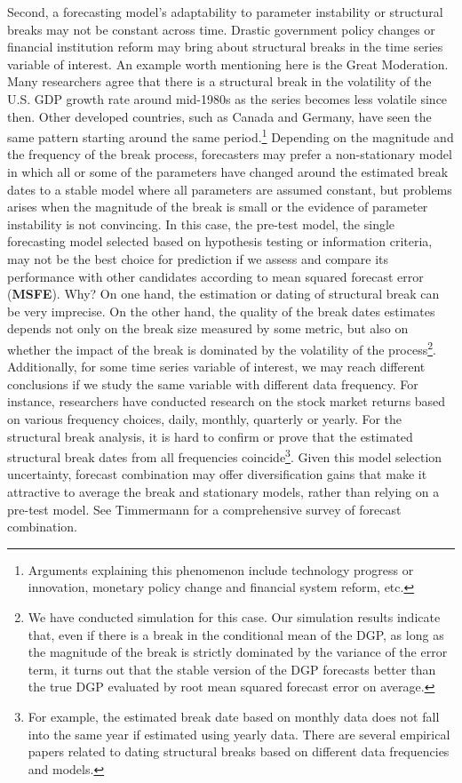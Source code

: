 Second, a forecasting model's adaptability to parameter instability or structural breaks may not be constant across time. Drastic government policy changes or financial institution reform may bring about structural breaks in the time series variable of interest. An example worth mentioning here is the Great Moderation. Many researchers \cite{Stock_Watson_JEL2003} \cite{Stock_DEECON2004} agree that there is a structural break in the volatility of the U.S. GDP growth rate around mid-1980s as the series becomes less volatile since then. Other developed countries, such as Canada and Germany, have seen the same pattern starting around the same period.\footnote{Arguments explaining this phenomenon include technology progress or innovation, monetary policy change and financial system reform, etc.} Depending on the magnitude and the frequency of the break process, forecasters may prefer a non-stationary model in which all or some of the parameters have changed around the estimated break dates to a stable model where all parameters are assumed constant, but problems arises when the magnitude of the break is small or the evidence of parameter instability is not convincing. In this case, the pre-test model, the single forecasting model selected based on hypothesis testing or information criteria, may not be the best choice for prediction if we assess and compare its performance with other candidates according to mean squared forecast error (\textbf{MSFE}). Why? On one hand, the estimation or dating of structural break can be very imprecise. On the other hand, the quality of the break dates estimates depends not only on the break size measured by some metric, but also on whether the impact of the break is dominated by the volatility of the process\footnote{We have conducted simulation for this case. Our simulation results indicate that, even if there is a break in the conditional mean of the DGP, as long as the magnitude of the break is strictly dominated by the variance of the error term, it turns out that the stable version of the DGP forecasts better than the true DGP evaluated by root mean squared forecast error on average.}. Additionally, for some time series variable of interest, we may reach different conclusions if we study the same variable with different data frequency. For instance, researchers have conducted research on the stock market returns based on various frequency choices, daily, monthly, quarterly or yearly. For the structural break analysis, it is hard to confirm or prove that the estimated structural break dates from all frequencies coincide\footnote{For example, the estimated break date based on monthly data does not fall into the same year if estimated using yearly data. There are several empirical papers \cite{rapach_wohar_JFE2006} \cite{paye_timmermann_JEF2006} related to dating structural breaks based on different data frequencies and models.}. Given this model selection uncertainty, forecast combination may offer diversification gains that make it attractive to average the break and stationary models, rather than relying on a pre-test model. See Timmermann \cite{timmermann2006forecast} for a comprehensive survey of forecast combination.

